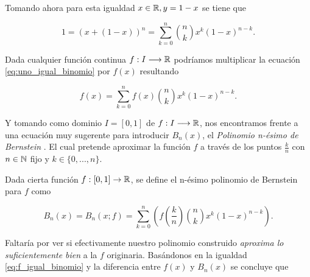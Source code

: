 Tomando ahora para esta igualdad $x \in \mathbb{R}, y= 1-x$ se tiene que 

\begin{equation}\label{eq:uno_igual_binomio}
    1 = (x+ (1-x))^n = \sum_{k=0}^n \binom{n}{k} x^{k} (1-x)^{n-k}.
\end{equation}

Dada cualquier función continua $f: I \longrightarrow \mathbb{R}$ podríamos multiplicar la ecuación 
\eqref{eq:uno_igual_binomio} por $f(x)$ resultando 

\begin{equation}\label{eq:f_igual_binomio}
    f(x) = \sum_{k=0}^n f(x) \binom{n}{k} x^{k} (1-x)^{n-k}.
\end{equation} 

Y tomando como dominio $I=[0,1]$ de $f: I \longrightarrow \mathbb{R}$,
 nos encontramos
frente a una ecuación muy sugerente para introducir $B_n(x)$, el \textit{Polinomio n-ésimo  de Bernstein }. 
El cual pretende  aproximar la función $f$ a través de los puntos $\frac{k}{n}$ con $n \in \mathbb{N}$ fijo
y $k \in \{0,...,n \}.$

\begin{definicion} \label{def:Bernstein}
    Dada cierta función $f: [0,1] \rightarrow \mathbb{R}$, se define el n-ésimo polinomio de Bernstein para $f$ como 

    $$B_n(x) = B_n(x;f)=\sum_ {k=0}^{n} \left( f \left( \frac{k}{n} \right) \binom{n}{k} x^k (1-x)^{n-k} \right).$$

\end{definicion}

Faltaría por ver si efectivamente nuestro polinomio construido
 \textit{aproxima lo suficientemente bien} a la $f$ originaria. 
Basándonos en la igualdad \eqref{eq:f_igual_binomio} y 
la diferencia entre $f(x)$ y $B_n(x)$ se concluye que


